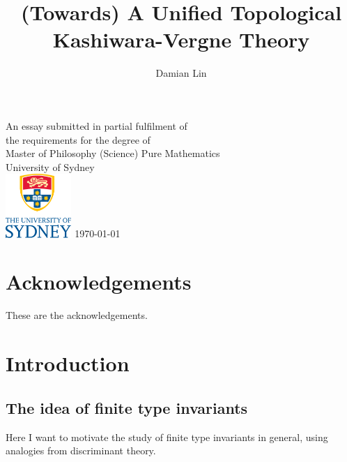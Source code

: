 \documentclass[12pt]{report}
\theoremstyle{regular}
\numberwithin{clause}{chapter}
\newcommand{\draftnote}[1]{
\begin{mdframed}[style=draftnote]
        {\color{Gray}{\scshape Note:} #1 }
\end{mdframed}
}
\begin{document}

        \author{Damian Lin}
        \title{(Towards) A Unified Topological Kashiwara-Vergne Theory}

        \cleardoublepage \thispagestyle{empty}
        \null \vfil
        \begingroup
        \LARGE \bfseries \centering
        \openup \medskipamount
        \thetitle \par \vspace{30pt}
        \centering \mdseries \theauthor \par \bigskip
        \endgroup
        \vfil \vfil \vfil
        \begin{center}
                An essay submitted in partial fulfilment of\\
                the requirements for the degree of\\
                Master of Philosophy (Science)
                \vfil\vfil
                {\large Pure Mathematics\\[5pt]
                        University of Sydney}\\
                \vskip6mm
                \includegraphics[width=25mm]{graphics/USY_MB1_CMYK_Stacked_Logo.pdf}
                \vfil
                \normalsize\today
        \end{center}
        \vfil
        \cleardoublepage

        \tableofcontents

        \chapter*{Acknowledgements}

        These are the acknowledgements.

        \chapter*{Introduction}

        \section*{The idea of finite type invariants}
        \draftnote{Here I want to motivate the study of finite type invariants in general, using analogies from discriminant theory.}
\end{document}
